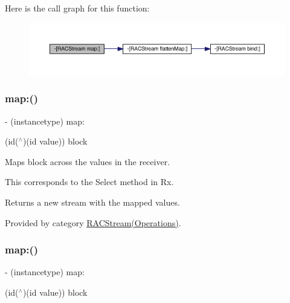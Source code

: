 Here is the call graph for this function\+:\nopagebreak
\begin{figure}[H]
\begin{center}
\leavevmode
\includegraphics[width=350pt]{interface_r_a_c_stream_ae8e14cc70fb3979e6128d28b003bba3f_cgraph}
\end{center}
\end{figure}
\mbox{\label{interface_r_a_c_stream_ae8e14cc70fb3979e6128d28b003bba3f}} 
\subsubsection{\texorpdfstring{map\+:()}{map:()}\hspace{0.1cm}{\footnotesize\ttfamily [2/3]}}
{\footnotesize\ttfamily -\/ (instancetype) map\+: \begin{DoxyParamCaption}\item[{(id($^\wedge$)(id value))}]{block }\end{DoxyParamCaption}}

Maps {\ttfamily block} across the values in the receiver.

This corresponds to the {\ttfamily Select} method in Rx.

Returns a new stream with the mapped values. 

Provided by category \mbox{\hyperlink{category_r_a_c_stream_07_operations_08_ae8e14cc70fb3979e6128d28b003bba3f}{R\+A\+C\+Stream(\+Operations)}}.

\mbox{\label{interface_r_a_c_stream_ae8e14cc70fb3979e6128d28b003bba3f}} 
\subsubsection{\texorpdfstring{map\+:()}{map:()}\hspace{0.1cm}{\footnotesize\ttfamily [3/3]}}
{\footnotesize\ttfamily -\/ (instancetype) map\+: \begin{DoxyParamCaption}\item[{(id($^\wedge$)(id value))}]{block }\end{DoxyParamCaption}}

